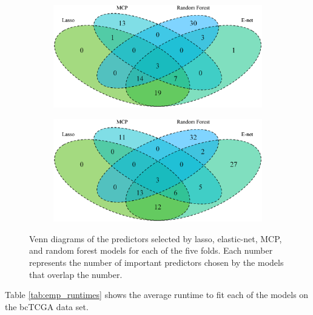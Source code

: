 \documentclass{article}
\begin{document}
\begin{figure}[h!]
\begin{subfigure}[b]{0.45\textwidth}
		\label{fig:venn3}
	\end{subfigure}
	\begin{subfigure}[b]{0.45\textwidth}
		\includegraphics[width=\textwidth]{images/venn/venn4.eps}
		\label{fig:venn4}
	\end{subfigure}
	\hspace{30pt}
	\begin{subfigure}[b]{0.45\textwidth}
		\includegraphics[width=\textwidth]{images/venn/venn5.eps}
		\label{fig:venn5}
	\end{subfigure}
	\captionsetup{width = 5in}
	\caption{Venn diagrams of the predictors selected by lasso, elastic-net, MCP, and random forest models for each of the five folds. Each number represents the number of important predictors chosen by the models that overlap the number.}
	\label{fig:venn}
\end{figure}

Table \ref{tab:emp_runtimes} shows the average runtime to fit each of the models on the bcTCGA data set.
\end{document}
